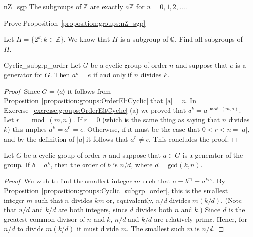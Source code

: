  
\begin{prop}{nZ_sgp}
The subgroups of ${\mathbb Z}$ are exactly $n{\mathbb Z}$ for $n = 0, 1, 2,
\ldots$. 
\end{prop}

\begin{exercise}{}
Prove Proposition~\ref{proposition:groups:nZ_sgp}
\end{exercise}

\begin{exercise}{}
Let $H = \{2^k : k \in {\mathbb Z} \}$. We know that $H$ is a subgroup of $\mathbb{Q}$.  Find all subgroups of $H$. 
\end{exercise}
 
 
\begin{prop}{Cyclic_subgrp_order}
Let $G$ be a cyclic group of order $n$ and suppose that $a$ is a
generator for  $G$. Then $a^k=e$ if and only if $n$ divides $k$.
\end{prop}
 
 
\begin{proof}
Since $G=\langle a \rangle$ it follows from Proposition~\ref{proposition:groups:OrderEltCyclic} that $|a|=n$. In Exercise~\ref{exercise:groups:OrderEltCyclic} (a) we proved that  $a^k =  a^{\bmod(m,n)}$. Let $r =\bmod(m,n)$.  If $r=0$ (which is the same thing as saying that $n$ divides $k$) this implies $a^k =  a^{0} = e$. Otherwise, if it must be the case that $0< r< n=|a|$, and by the definition of $|a|$ it follows that $a^r \neq e$. This concludes the proof.
\end{proof}

\begin{prop}{}
Let $G$ be a cyclic group of order $n$ and suppose that $a \in G$ is a
generator of the group.  If $b = a^k$, then the order of $b$ is $n
/d$, where $d = \text{gcd}(k,n)$. 
\end{prop}
 
 
\begin{proof}
We wish to find the smallest integer $m$ such that $e = b^m = a^{km}$.
By Proposition~\ref{proposition:groups:Cyclic_subgrp_order}, this is the smallest integer $m$ such that
$n$ divides $km$ or, equivalently, $n/d$ divides $m(k/d)$. (Note that $n/d$ and $k/d$ are both integers, since $d$ divides both $n$ and $k$.)  Since $d$ is
the greatest common divisor of $n$ and $k$, $n/d$ and $k/d$ are
relatively prime. Hence, for $n/d$ to divide $m(k/d)$ it must divide
$m$.  The smallest such $m$ is $n/d$. 
\end{proof}
 

